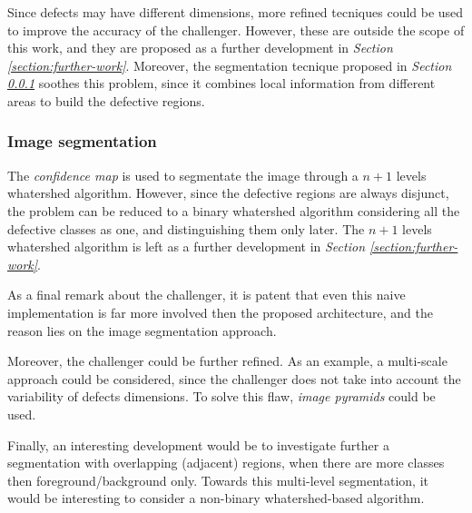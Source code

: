 \par{
	Since defects may have different dimensions, more refined tecniques could be used to improve the accuracy of the challenger. However, these are outside the scope of this work, and they are proposed as a further development in \emph{Section \ref{section:further-work}}. Moreover, the segmentation tecnique proposed in \emph{Section \ref{section:challenger:image-segmentation}} soothes this problem, since it combines local information from different areas to build the defective regions.
}
\subsubsection{Image segmentation}\label{section:challenger:image-segmentation}
\par{
	The \emph{confidence map} is used to segmentate the image through a $n+1$ levels whatershed algorithm. However, since the defective regions are always disjunct, the problem can be reduced to a binary whatershed algorithm \cite{ieee:87344} considering all the defective classes as one, and distinguishing them only later. The $n+1$ levels whatershed algorithm is left as a further development in \emph{Section \ref{section:further-work}}.
}
\par{
	As a final remark about the challenger, it is patent that even this naive implementation is far more involved then the proposed architecture, and the reason lies on the image segmentation approach.
}
\par{
	Moreover, the challenger could be further refined. As an example, a multi-scale approach could be considered, since the challenger does not take into account the variability of defects dimensions. To solve this flaw, \emph{image pyramids} could be used.
}
\par{
	Finally, an interesting development would be to investigate further a segmentation with overlapping (adjacent) regions, when there are more classes then foreground/background only. Towards this multi-level segmentation, it would be interesting to consider a non-binary whatershed-based algorithm.
}